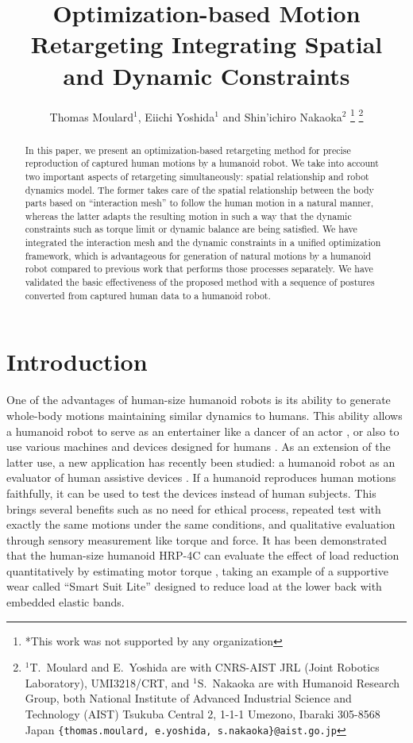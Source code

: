 \documentclass[letterpaper, 10 pt, conference]{ieeeconf}  %
\title{\LARGE \bf
Optimization-based Motion Retargeting Integrating Spatial and Dynamic Constraints
}
\author{Thomas Moulard$^{1}$, Eiichi Yoshida$^{1}$ and Shin'ichiro
  Nakaoka$^{2}$%
\thanks{*This work was not supported by any organization}%
\thanks{$^{1}$T.~Moulard and E.~Yoshida are with CNRS-AIST JRL (Joint
  Robotics Laboratory), UMI3218/CRT, and $^{1}$S.~Nakaoka are with
  Humanoid Research Group, both National Institute of Advanced Industrial Science and Technology (AIST)
Tsukuba Central 2, 1-1-1 Umezono, Ibaraki 305-8568 Japan
        {\tt\footnotesize \{thomas.moulard, e.yoshida, s.nakaoka\}@aist.go.jp}}%
}
\begin{document}
\maketitle
\thispagestyle{empty}
\pagestyle{empty}


\begin{abstract}
In this paper, we present an optimization-based retargeting method for
precise reproduction of captured human motions by a humanoid robot.
We take into account two important aspects of retargeting
simultaneously: spatial relationship and robot dynamics model.  The
former takes care of the spatial relationship between the body parts
based on ``interaction mesh'' to follow the human motion in a natural
manner, whereas the latter adapts the resulting motion in such a way
that the dynamic constraints such as torque limit or dynamic balance
are being satisfied.  We have integrated the interaction mesh and the
dynamic constraints in a unified optimization framework, which is
advantageous for generation of natural motions by a humanoid robot
compared to previous work that performs those processes
separately. 
We have validated the basic effectiveness of the proposed method
with a sequence of postures converted from captured human  data to a
humanoid robot.
\end{abstract}



\section{Introduction}
\label{sec:intro}

One of the advantages of human-size humanoid robots is
its ability to generate whole-body motions maintaining similar
dynamics to humans.
This ability allows a humanoid robot to serve as an entertainer like
a dancer of an actor \cite{nakaoka_iros2010}, or also to use various
machines and devices designed for humans \cite{Yokoi03iros}.
As an extension of the latter use, a new application
has recently been studied: a humanoid robot as an evaluator of human
assistive devices \cite{Takanishi06ICRA,Miura13ICRA}.
If a humanoid reproduces human motions faithfully, it can be used to
test the devices instead of human subjects.
This brings several benefits such as no need for ethical
process, repeated test with exactly the same motions under the same
conditions, and qualitative evaluation through sensory measurement
like torque and force.
It has been demonstrated that the human-size humanoid HRP-4C
\cite{Kaneko09Humanoids}  can evaluate the effect of load reduction
quantitatively by estimating motor torque \cite{Miura13ICRA}, taking
an example of a supportive wear called ``Smart Suit Lite''
\cite{Tanaka11JRM} designed to reduce load
at the lower back with embedded elastic bands.
\end{document}
